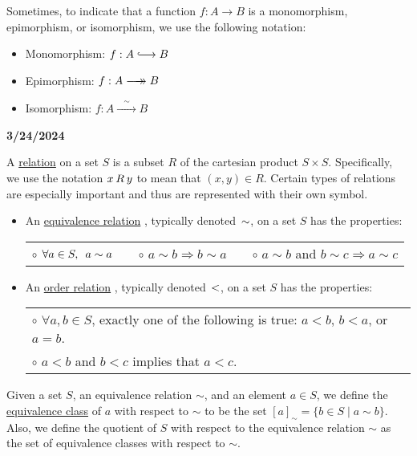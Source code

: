 \documentclass{book}
\newcommand{\hooklongrightarrow}{\lhook\joinrel\longrightarrow}
\newcommand{\longrightarrowdbl}{\longrightarrow\mathrel{\mkern-14mu}\rightarrow}
\newcommand{\udefine}[1]{{%
   \setulcolor{Red}%
   \setul{0.14em}{0.07em}%
   \ul{#1}%
}}
\newcommand*{\markDate}[1]{%
   {\huge \color{Black} \textbf{#1} \newline}%
}
\newcommand{\myHS}{ \hspace{0.5em}}
\newcommand{\retTwo}{\hfill\bigbreak}
\begin{document}
   Sometimes, to indicate that a function $f: A \rightarrow B$ is a monomorphism,\\ epimorphism, or isomorphism, we use the following notation:
   \begin{itemize}
      \item Monomorphism: $f: A \hooklongrightarrow B$
      \item Epimorphism: $f: A \longrightarrowdbl B$
      \item Isomorphism: $f: A \xrightarrow{\phantom{a}\sim\phantom{a}} B$
   \end{itemize}

   \newpage
   \markDate{3/24/2024}

   A \udefine{relation} on a set $S$ is a subset $R$ of the cartesian product $S \times S$. Specifically,\\ we use the notation $x \hspace{0.2em}R\hspace{0.2em} y$ to mean that $(x, y) \in R$. Certain types of relations\\ are especially important and thus are represented with their own symbol.
   \begin{itemize}
      \item An \udefine{equivalence relation}, typically denoted $\hspace{0.1em}\sim$, on a set $S$ has the properties:\\
      \begin{tabular}{l c l c l}
         $\circ$ $\forall a \in S,\myHS a \sim a$ &\quad& $\circ$ $a \sim b \Longrightarrow b \sim a$ &\quad& $\circ$ $a \sim b$ and $b \sim c \Longrightarrow a \sim c$
      \end{tabular}

      \item An \udefine{order relation}, typically denoted $\hspace{0.1em}<$, on a set $S$ has the properties:\\
      \begin{tabular}{l}
         $\circ$ $\forall a, b \in S$, exactly one of the following is true: $a < b$, $b < a$, or $a = b$.\\
         $\circ$ $a < b$ and $b < c$ implies that $a < c$.\retTwo
      \end{tabular}
   \end{itemize}

   Given a set $S$, an equivalence relation $\sim$, and an element $a \in S$, we define the\\ \udefine{equivalence class} of $a$ with respect to $\sim$ to be the set $[a]_\sim = \{b \in S \mid a \sim b\}$.\\ Also, we define the quotient of $S$ with respect to the equivalence relation $\sim$ as\\ the set of equivalence classes with respect to $\sim$.
\end{document}
